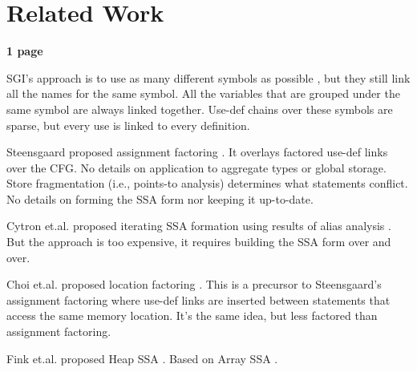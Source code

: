 \section{Related Work}

\textbf{1 page}

SGI's approach is to use as many different symbols as possible
\cite{bib:chow.ea-96}, but they still link all the names for the
same symbol.  All the variables that are grouped under the same
symbol are always linked together.  Use-def chains over these
symbols are sparse, but every use is linked to every definition.

Steensgaard proposed assignment factoring
\cite{bib:steensgaard-95}.  It overlays factored use-def links
over the CFG.  No details on application to aggregate types or
global storage.  Store fragmentation (i.e., points-to analysis)
determines what statements conflict.  No details on forming the
SSA form nor keeping it up-to-date.

Cytron et.al. proposed iterating SSA formation using results of alias
analysis \cite{bib:cytron.ea-93}.  But the approach is too
expensive, it requires building the SSA form over and over.

Choi et.al. proposed location factoring \cite{bib:choi.ea-94}.
This is a precursor to Steensgaard's assignment factoring where
use-def links are inserted between statements that access the
same memory location.  It's the same idea, but less factored than
assignment factoring.

Fink et.al. proposed Heap SSA \cite{bib:fink.ea-00}.  Based on Array SSA
\cite{bib:knobe.ea-98}.
